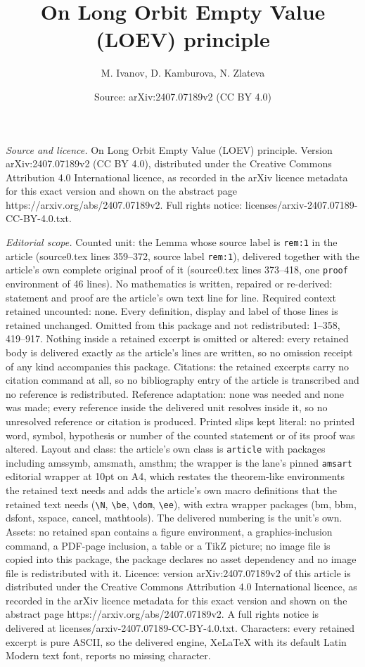 \documentclass[10pt,a4paper]{amsart}
\title[On Long Orbit Empty Value (LOEV) principle]{On Long Orbit Empty Value (LOEV) principle}
\author{M. Ivanov, D. Kamburova, N. Zlateva}
\date{Source: arXiv:2407.07189v2 (CC BY 4.0)}
\begin{document}
\maketitle

\noindent\emph{Source and licence.} On Long Orbit Empty Value (LOEV) principle. Version arXiv:2407.07189v2 (CC BY 4.0), distributed under the Creative Commons Attribution 4.0 International licence, as recorded in the arXiv licence metadata for this exact version and shown on the abstract page https://arxiv.org/abs/2407.07189v2. Full rights notice: licenses/arxiv-2407.07189-CC-BY-4.0.txt.\par\smallskip

\noindent\textit{Editorial scope.} Counted unit: the Lemma whose source label is \texttt{rem:1} in the article (source0.tex lines 359--372, source label \texttt{rem:1}), delivered together with the article's own complete original proof of it (source0.tex lines 373--418, one \texttt{proof} environment of 46 lines). No mathematics is written, repaired or re-derived: statement and proof are the article's own text line for line. Required context retained uncounted: none. Every definition, display and label of those lines is retained unchanged. Omitted from this package and not redistributed: 1--358, 419--917. Nothing inside a retained excerpt is omitted or altered: every retained body is delivered exactly as the article's lines are written, so no omission receipt of any kind accompanies this package. Citations: the retained excerpts carry no citation command at all, so no bibliography entry of the article is transcribed and no reference is redistributed. Reference adaptation: none was needed and none was made; every reference inside the delivered unit resolves inside it, so no unresolved reference or citation is produced. Printed slips kept literal: no printed word, symbol, hypothesis or number of the counted statement or of its proof was altered. Layout and class: the article's own class is \texttt{article} with packages including amssymb, amsmath, amsthm; the wrapper is the lane's pinned \texttt{amsart} editorial wrapper at 10pt on A4, which restates the theorem-like environments the retained text needs and adds the article's own macro definitions that the retained text needs (\texttt{\textbackslash N}, \texttt{\textbackslash be}, \texttt{\textbackslash dom}, \texttt{\textbackslash ee}), with extra wrapper packages (bm, bbm, dsfont, xspace, cancel, mathtools). The delivered numbering is the unit's own. Assets: no retained span contains a figure environment, a graphics-inclusion command, a PDF-page inclusion, a table or a TikZ picture; no image file is copied into this package, the package declares no asset dependency and no image file is redistributed with it. Licence: version arXiv:2407.07189v2 of this article is distributed under the Creative Commons Attribution 4.0 International licence, as recorded in the arXiv licence metadata for this exact version and shown on the abstract page https://arxiv.org/abs/2407.07189v2. A full rights notice is delivered at licenses/arxiv-2407.07189-CC-BY-4.0.txt. Characters: every retained excerpt is pure ASCII, so the delivered engine, XeLaTeX with its default Latin Modern text font, reports no missing character.
\end{document}
